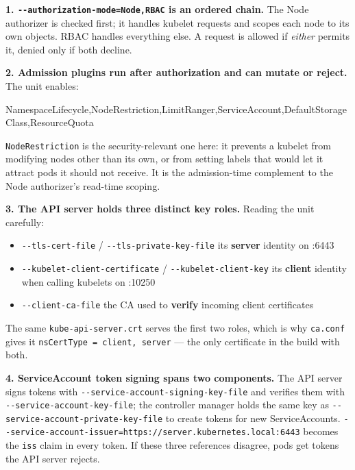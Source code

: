 \documentclass[11pt,oneside]{report}
\providecommand{\tightlist}{%
  \setlength{\itemsep}{0pt}\setlength{\parskip}{0pt}}
\begin{document}
\textbf{1.
\texttt{-\/-authorization-}\allowbreak{}\texttt{mode=Node,RBAC}
is an ordered
chain.} The Node
authorizer is
checked first; it
handles kubelet
requests and scopes
each node to its own
objects. RBAC
handles everything
else. A request is
allowed if
\emph{either}
permits it, denied
only if both
decline.

\textbf{2. Admission
plugins run after
authorization and
can mutate or
reject.} The unit
enables:

\begin{outlst}
NamespaceLifecycle,NodeRestriction,LimitRanger,ServiceAccount,DefaultStorageClass,ResourceQuota
\end{outlst}

\texttt{NodeRestriction}
is the
security-relevant
one here: it
prevents a kubelet
from modifying nodes
other than its own,
or from setting
labels that would
let it attract pods
it should not
receive. It is the
admission-time
complement to the
Node authorizer's
read-time scoping.

\textbf{3. The API
server holds three
distinct key roles.}
Reading the unit
carefully:

\begin{itemize}
\tightlist
\item
  \texttt{-\/-tls-cert-file}
  /
  \texttt{-\/-tls-}\allowbreak{}\texttt{private-}\allowbreak{}\texttt{key-}\allowbreak{}\texttt{file}
  \textrightarrow{}
  its
  \textbf{server}
  identity on :6443
\item
  \texttt{-\/-kubelet-}\allowbreak{}\texttt{client-}\allowbreak{}\texttt{certificate}
  /
  \texttt{-\/-kubelet-}\allowbreak{}\texttt{client-}\allowbreak{}\texttt{key}
  \textrightarrow{}
  its
  \textbf{client}
  identity when
  calling kubelets
  on :10250
\item
  \texttt{-\/-client-}\allowbreak{}\texttt{ca-}\allowbreak{}\texttt{file}
  \textrightarrow{}
  the CA used to
  \textbf{verify}
  incoming client
  certificates
\end{itemize}

The same
\texttt{kube-}\allowbreak{}\texttt{api-}\allowbreak{}\texttt{server.}\allowbreak{}\texttt{crt}
serves the first two
roles, which is why
\texttt{ca.conf}
gives it
\texttt{nsCertType\ =\ client,\ server}
--- the only
certificate in the
build with both.

\textbf{4.
ServiceAccount token
signing spans two
components.} The API
server signs tokens
with
\texttt{-\/-service-}\allowbreak{}\texttt{account-}\allowbreak{}\texttt{signing-}\allowbreak{}\texttt{key-}\allowbreak{}\texttt{file}
and verifies them
with
\texttt{-\/-service-}\allowbreak{}\texttt{account-}\allowbreak{}\texttt{key-}\allowbreak{}\texttt{file};
the controller
manager holds the
same key as
\texttt{-\/-service-}\allowbreak{}\texttt{account-}\allowbreak{}\texttt{private-}\allowbreak{}\texttt{key-}\allowbreak{}\texttt{file}
to create tokens for
new ServiceAccounts.
\texttt{-\/-service-}\allowbreak{}\texttt{account-}\allowbreak{}\texttt{issuer=https:}\allowbreak{}\texttt{/}\allowbreak{}\texttt{/}\allowbreak{}\texttt{server.}\allowbreak{}\texttt{kubernetes.}\allowbreak{}\texttt{local:}\allowbreak{}\texttt{6443}
becomes the
\texttt{iss} claim
in every token. If
these three
references disagree,
pods get tokens the
API server rejects.
\end{document}
